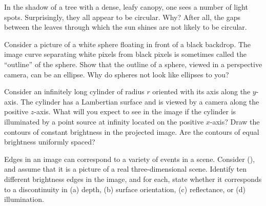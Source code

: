 
\begin{exercise}
In the shadow of a tree with a dense, leafy canopy, one sees a number of 
light spots. Surprisingly, they all appear to be circular. Why? After all,
the gaps between the leaves through which the sun shines are not
likely to be circular.
\end{exercise} 

\begin{uexercise}
Consider a picture of a white sphere floating in front of a black backdrop.  The image curve separating white pixels from
black pixels is sometimes called the ``outline'' of the sphere.  Show that the outline of a sphere, viewed in
a perspective camera, can be an ellipse.  Why do spheres not look like ellipses to you?
\end{uexercise} 

\begin{exercise}
Consider an infinitely long cylinder of radius \(r\) oriented with its
axis along the \(y\)-axis. The cylinder has a Lambertian surface
and is viewed by a camera along the positive \(z\)-axis.  What will you
expect to see in the image  if the cylinder is
illuminated by a point source at infinity located on the positive
\(x\)-axis?  Draw the contours of constant brightness in
the projected image. Are the contours of equal brightness uniformly spaced?
\end{exercise} 



\begin{exercise}
Edges in an image can correspond to a variety of events in a scene.
Consider  (), and
assume that it is a picture of a real three-dimensional
scene. Identify ten different brightness edges in the image, and for
each, state whether it corresponds to a discontinuity in (a) depth,
(b) surface orientation, (c) reflectance, or (d) illumination.
\end{exercise} 



